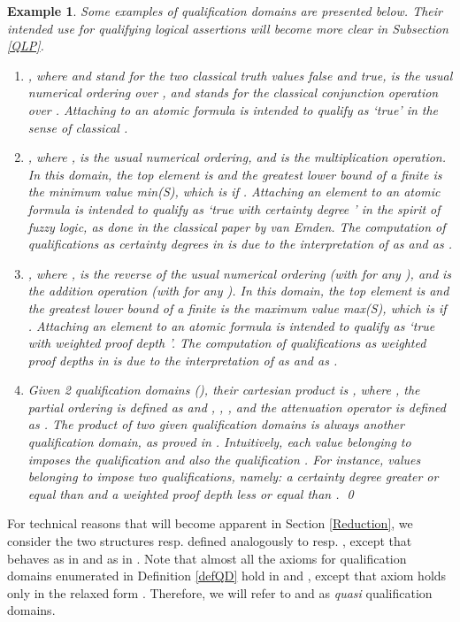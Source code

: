 \documentclass{sigplanconf}
\theoremstyle{definition}
\theoremstyle{plain}
\newtheorem{example}{Example}
\begin{document}
\begin{example} \label{someDomains}
Some examples of  qualification domains are presented below. Their intended use for qualifying logical assertions will become more clear in Subsection \ref{QLP}.
\begin{enumerate}
\item
, where  and  stand for the two classical truth values  \emph{false} and \emph{true},  is the usual numerical ordering over , and  stands for the classical conjunction operation over . Attaching  to  an atomic formula   is intended to qualify  as `true' in the sense of classical .
\item
, where ,  is the usual numerical ordering, and  is the multiplication operation. In this domain,  the top element  is  and the greatest lower bound  of a finite  is the minimum value min(S), which is  if . Attaching an  element   to an atomic formula   is intended to qualify  as `true with certainty  degree ' in the spirit of fuzzy logic, as done in the classical paper \cite{VE86} by van Emden. The computation of qualifications  as certainty degrees in  is due to the interpretation of  as  and  as .
\item
, where ,  is the reverse of the usual numerical ordering (with  for any ), and  is the addition operation (with  for any ). In this domain,  the top element  is  and the greatest lower bound  of a finite  is the maximum value max(S), which is  if . Attaching an element  to an atomic formula  is intended to qualify  as `true with weighted proof depth '. The computation of qualifications  as weighted proof depths in  is due to the interpretation  of  as  and  as .
\item
Given 2 qualification domains   (), their {\em cartesian product}  is , where  , the partial ordering  is defined as  and , , , and the attenuation operator  is defined as
. The product of two given qualification domains is always another  qualification domain, as proved in \cite{RR08}. Intuitively, each value  belonging to  imposes the qualification  {\em and also} the qualification . For instance, values  belonging to  impose two qualifications, namely: a certainty degree greater or equal than  and a weighted proof depth less or equal than . \qed
\end{enumerate}
\end{example}

For technical reasons that will become apparent in Section \ref{Reduction}, we consider the two structures  resp.  defined analogously to   resp. , except that  behaves as  in  and as  in . Note that almost all the axioms for qualification domains enumerated in Definition \ref{defQD} hold in  and , except that axiom  holds only in the relaxed form
. Therefore, we will refer to  and  as {\em quasi} qualification domains.
\end{document}
